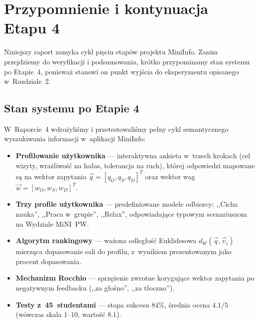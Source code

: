 \documentclass[14pt,a4paper]{extarticle}
\begin{document}
\pagestyle{fancy}
\fancyhf{}
\rfoot{\footnotesize \thepage}
\renewcommand{\headrulewidth}{0.4pt}
\renewcommand{\footrulewidth}{0.4pt}

\section{Przypomnienie i kontynuacja Etapu 4}

Niniejszy raport zamyka cykl pięciu etapów projektu MiniInfo. Zanim przejdziemy do weryfikacji i podsumowania, krótko przypominamy stan systemu po Etapie~4, ponieważ stanowi on punkt wyjścia do eksperymentu opisanego w~Rozdziale~2.

\subsection{Stan systemu po Etapie 4}

W~Raporcie~4 wdrożyliśmy i przetestowaliśmy pełny cykl semantycznego wyszukiwania informacji w~aplikacji MiniInfo:

\begin{itemize}
    \item \textbf{Profilowanie użytkownika} --- interaktywna ankieta w~trzech krokach (cel wizyty, wrażliwość na hałas, tolerancja na ruch), której odpowiedzi mapowane są na wektor zapytania $\vec{q} = [q_O, q_S, q_D]^T$ oraz wektor wag $\vec{w} = [w_O, w_S, w_D]^T$.
    \item \textbf{Trzy profile użytkownika} --- predefiniowane modele odbiorcy: ,,Cicha nauka'', ,,Praca w~grupie'', ,,Relax'', odpowiadające typowym scenariuszom na Wydziale MiNI~PW.
    \item \textbf{Algorytm rankingowy} --- ważona odległość Euklidesowa $d_W(\vec{q}, \vec{v}_i)$ mierząca dopasowanie sali do profilu, z~wynikiem prezentowanym jako procent dopasowania.
    \item \textbf{Mechanizm Rocchio} --- sprzężenie zwrotne korygujące wektor zapytania po negatywnym feedbacku (,,za głośno'', ,,za tłoczno'').
    \item \textbf{Testy z~45~studentami} --- stopa sukcesu $84\%$, średnia ocena $4.1/5$ (wówczas skala $1$--$10$, wartość $8.1$).
\end{itemize}
\end{document}
